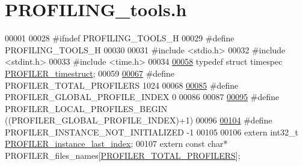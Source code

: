 \hypertarget{_p_r_o_f_i_l_i_n_g__tools_8h_source}{\section{\-P\-R\-O\-F\-I\-L\-I\-N\-G\-\_\-tools.\-h}
}

\begin{DoxyCode}
00001 
00028 \textcolor{preprocessor}{#ifndef PROFILING\_TOOLS\_H}
00029 \textcolor{preprocessor}{}\textcolor{preprocessor}{#define PROFILING\_TOOLS\_H}
00030 \textcolor{preprocessor}{}
00031 \textcolor{preprocessor}{#include <stdio.h>}
00032 \textcolor{preprocessor}{#include <stdint.h>}
00033 \textcolor{preprocessor}{#include <time.h>}
00034 
\hypertarget{_p_r_o_f_i_l_i_n_g__tools_8h_source_l00058}{}\hyperlink{group___xD0_x9F_xD0_xBE_xD1_x80_xD1_x82_xD0_xB8_xD1_x80_xD1_x83_xD0_xB5_xD0_xBC_xD0_xB0_xD1_x8F_2ef1b31e26d7139e4bfe94879d1322e3_gae02193769f3b21a09fc0d5035e566a75}{00058} \textcolor{keyword}{typedef} \textcolor{keyword}{struct }timespec \hyperlink{group___xD0_x9F_xD0_xBE_xD1_x80_xD1_x82_xD0_xB8_xD1_x80_xD1_x83_xD0_xB5_xD0_xBC_xD0_xB0_xD1_x8F_2ef1b31e26d7139e4bfe94879d1322e3_gae02193769f3b21a09fc0d5035e566a75}{PROFILER_timestruct};
00059  
\hypertarget{_p_r_o_f_i_l_i_n_g__tools_8h_source_l00067}{}\hyperlink{group___xD0_x9F_xD0_xBE_xD1_x80_xD1_x82_xD0_xB8_xD1_x80_xD1_x83_xD0_xB5_xD0_xBC_xD0_xB0_xD1_x8F_2ef1b31e26d7139e4bfe94879d1322e3_ga775939d541e95ea75e6e7066a1cc6bcb}{00067} \textcolor{preprocessor}{#define PROFILER\_TOTAL\_PROFILERS                1024}
00068 \textcolor{preprocessor}{}
\hypertarget{_p_r_o_f_i_l_i_n_g__tools_8h_source_l00085}{}\hyperlink{_p_r_o_f_i_l_i_n_g__tools_8h_a39949f1889adb640b9d00c1e794e4038}{00085} \textcolor{preprocessor}{#define PROFILER\_GLOBAL\_PROFILE\_INDEX           0}
00086 \textcolor{preprocessor}{}
00087 
\hypertarget{_p_r_o_f_i_l_i_n_g__tools_8h_source_l00095}{}\hyperlink{_p_r_o_f_i_l_i_n_g__tools_8h_a27d5c6f98201a8f99357c6a5c4b82e66}{00095} \textcolor{preprocessor}{#define PROFILER\_LOCAL\_PROFILES\_BEGIN          
       ((PROFILER\_GLOBAL\_PROFILE\_INDEX)+1)}
00096 \textcolor{preprocessor}{}
\hypertarget{_p_r_o_f_i_l_i_n_g__tools_8h_source_l00104}{}\hyperlink{_p_r_o_f_i_l_i_n_g__tools_8h_adfa1dd598814dd5a5c73276c47cba92d}{00104} \textcolor{preprocessor}{#define PROFILER\_INSTANCE\_NOT\_INITIALIZED       -1}
00105 \textcolor{preprocessor}{}
00106 \textcolor{keyword}{extern} int32\_t \hyperlink{_p_r_o_f_i_l_i_n_g__tools_8c_ab45d681232a34daa38cb1419306a1bf2}{PROFILER_instance_last_index};
00107 \textcolor{keyword}{extern} \textcolor{keyword}{const} \textcolor{keywordtype}{char}* PROFILER\_files\_names[\hyperlink{group___xD0_x9F_xD0_xBE_xD1_x80_xD1_x82_xD0_xB8_xD1_x80_xD1_x83_xD0_xB5_xD0_xBC_xD0_xB0_xD1_x8F_2ef1b31e26d7139e4bfe94879d1322e3_ga775939d541e95ea75e6e7066a1cc6bcb}{PROFILER_TOTAL_PROFILERS}];

\end{DoxyCode}
